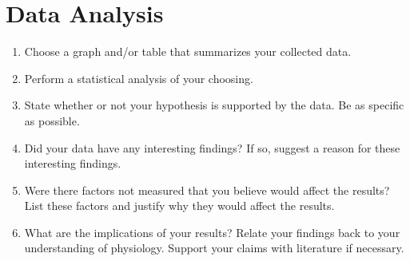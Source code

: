\documentclass{article}
\begin{document}
\section*{Data Analysis}
\begin{enumerate}
	\item Choose a graph and/or table that summarizes your collected data.
	\item Perform a statistical analysis of your choosing.
	\item State whether or not your hypothesis is supported by the data. Be as specific as possible.
	\item Did your data have any interesting findings? If so, suggest a reason for these interesting findings.
	\item Were there factors not measured that you believe would affect the results? List these factors and justify why they would affect the results.
	\item What are the implications of your results? Relate your findings back to your understanding of physiology. Support your claims with literature if necessary.
\end{enumerate}
\end{document}
